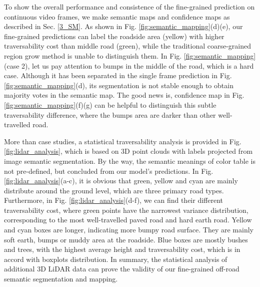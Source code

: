 \documentclass[letterpaper, 10 pt, conference]{ieeeconf}  %
\begin{document}
To show the overall performance and consistence of the fine-grained prediction on continuous video frames, we make semantic maps and confidence maps as described in Sec. \ref{3_SM}. As shown in Fig. \ref{fig:semantic_mapping}(d)(e), our fine-grained predictions can label the roadside area (yellow) with higher traversability cost than middle road (green), while the traditional coarse-grained region grow method is unable to distinguish them. In Fig. \ref{fig:semantic_mapping}(case 2), let us pay attention to bumps in the middle of the road, which is a hard case. Although it has been separated in the single frame prediction in Fig. \ref{fig:semantic_mapping}(d), its segmentation is not stable enough to obtain majority votes in the semantic map. The good news is, confidence map in Fig. \ref{fig:semantic_mapping}(f)(g) can be helpful to distinguish this subtle traversability difference, where the bumps area are darker than other well-travelled road.

More than case studies, a statistical traversability analysis is provided in Fig. \ref{fig:lidar_analysis}, which is based on 3D point clouds with labels projected from image semantic segmentation. By the way, the semantic meanings of color table is not pre-defined, but concluded from our model's predictions.
In Fig. \ref{fig:lidar_analysis}(a-c), it is obvious that green, yellow and cyan are mainly distribute around the ground level, which are three primary road types. Furthermore, in Fig. \ref{fig:lidar_analysis}(d-f), we can find their different traversability cost, where green points have the narrowest variance distribution, corresponding to the most well-travelled paved road and hard earth road. Yellow and cyan boxes are longer, indicating more bumpy road surface. They are mainly soft earth, bumps or muddy area at the roadside. Blue boxes are mostly bushes and trees, with the highest average height and traversability cost, which is in accord with boxplots distribution. In summary, the statistical analysis of additional 3D LiDAR data can prove the validity of our fine-grained off-road semantic segmentation and mapping.
\end{document}
